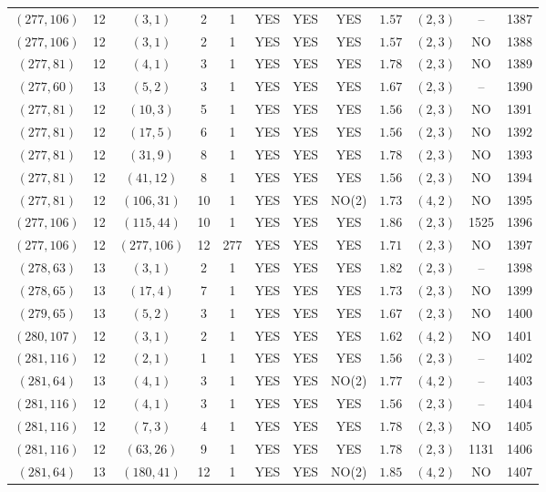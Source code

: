 \begin{longtable}{|c|c|c|c|c|c|c|c|c|c|c|c|}
$(277,106)$ & 12 & $(3,1)$ & 2 & 1 & YES & YES & YES & $1.57$ & $(2,3)$ & -- & 1387\\
$(277,106)$ & 12 & $(3,1)$ & 2 & 1 & YES & YES & YES & $1.57$ & $(2,3)$ & NO & 1388\\
$(277,81)$ & 12 & $(4,1)$ & 3 & 1 & YES & YES & YES & $1.78$ & $(2,3)$ & NO & 1389\\
$(277,60)$ & 13 & $(5,2)$ & 3 & 1 & YES & YES & YES & $1.67$ & $(2,3)$ & -- & 1390\\
$(277,81)$ & 12 & $(10,3)$ & 5 & 1 & YES & YES & YES & $1.56$ & $(2,3)$ & NO & 1391\\
$(277,81)$ & 12 & $(17,5)$ & 6 & 1 & YES & YES & YES & $1.56$ & $(2,3)$ & NO & 1392\\
$(277,81)$ & 12 & $(31,9)$ & 8 & 1 & YES & YES & YES & $1.78$ & $(2,3)$ & NO & 1393\\
$(277,81)$ & 12 & $(41,12)$ & 8 & 1 & YES & YES & YES & $1.56$ & $(2,3)$ & NO & 1394\\
$(277,81)$ & 12 & $(106,31)$ & 10 & 1 & YES & YES & NO(2) & $1.73$ & $(4,2)$ & NO & 1395\\
$(277,106)$ & 12 & $(115,44)$ & 10 & 1 & YES & YES & YES & $1.86$ & $(2,3)$ & 1525 & 1396\\
$(277,106)$ & 12 & $(277,106)$ & 12 & 277 & YES & YES & YES & $1.71$ & $(2,3)$ & NO & 1397\\
$(278,63)$ & 13 & $(3,1)$ & 2 & 1 & YES & YES & YES & $1.82$ & $(2,3)$ & -- & 1398\\
$(278,65)$ & 13 & $(17,4)$ & 7 & 1 & YES & YES & YES & $1.73$ & $(2,3)$ & NO & 1399\\
$(279,65)$ & 13 & $(5,2)$ & 3 & 1 & YES & YES & YES & $1.67$ & $(2,3)$ & NO & 1400\\
$(280,107)$ & 12 & $(3,1)$ & 2 & 1 & YES & YES & YES & $1.62$ & $(4,2)$ & NO & 1401\\
$(281,116)$ & 12 & $(2,1)$ & 1 & 1 & YES & YES & YES & $1.56$ & $(2,3)$ & -- & 1402\\
$(281,64)$ & 13 & $(4,1)$ & 3 & 1 & YES & YES & NO(2) & $1.77$ & $(4,2)$ & -- & 1403\\
$(281,116)$ & 12 & $(4,1)$ & 3 & 1 & YES & YES & YES & $1.56$ & $(2,3)$ & -- & 1404\\
$(281,116)$ & 12 & $(7,3)$ & 4 & 1 & YES & YES & YES & $1.78$ & $(2,3)$ & NO & 1405\\
$(281,116)$ & 12 & $(63,26)$ & 9 & 1 & YES & YES & YES & $1.78$ & $(2,3)$ & 1131 & 1406\\
$(281,64)$ & 13 & $(180,41)$ & 12 & 1 & YES & YES & NO(2) & $1.85$ & $(4,2)$ & NO & 1407\\

\end{longtable}
